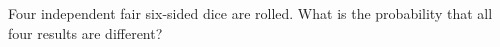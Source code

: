 Four independent fair six-sided dice are rolled. What is the probability that all four results are different?
